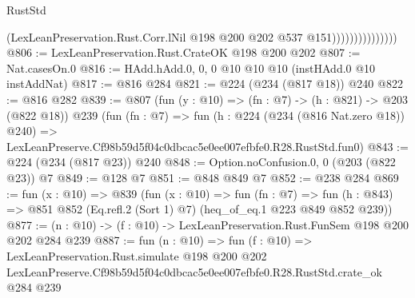 \begin{lexlean}{RustStd}
\begin{coremodule}
                                (LexLeanPreservation.Rust.Corr.lNil
                                  @198
                                  @200
                                  @202
                                  @537
                                  @151)))))))))))))))
@806 := LexLeanPreservation.Rust.CrateOK @198 @200 @202
@807 := Nat.casesOn.{0}
@816 := HAdd.hAdd.{0, 0, 0} @10 @10 @10 (instHAdd.{0} @10 instAddNat)
@817 := @816 @284
@821 := @224 (@234 (@817 @18)) @240
@822 := @816 @282
@839 := @807
    (fun (y : @10) => (fn : @7) -> (h : @821) -> @203 (@822 @18))
    @239
    (fun (fn : @7) =>
    fun (h : @224 (@234 (@816 Nat.zero @18)) @240) =>
    LexLeanPreserve.Cf98b59d5f04c0dbcac5e0ee007efbfe0.R28.RustStd.fun0)
@843 := @224 (@234 (@817 @23)) @240
@848 := Option.noConfusion.{0, 0} (@203 (@822 @23)) @7
@849 := @128 @7
@851 := @848 @849 @7
@852 := @238 @284
@869 := fun (x : @10) =>
  @839
    (fun (x : @10) =>
    fun (fn : @7) =>
    fun (h : @843) => @851 @852 (Eq.refl.{2} (Sort 1) @7) (heq_of_eq.{1} @223 @849 @852 @239))
@877 := (n : @10) -> (f : @10) -> LexLeanPreservation.Rust.FunSem @198 @200 @202 @284 @239
@887 := fun (n : @10) =>
  fun (f : @10) =>
  LexLeanPreservation.Rust.simulate
    @198
    @200
    @202
    LexLeanPreserve.Cf98b59d5f04c0dbcac5e0ee007efbfe0.R28.RustStd.crate_ok
    @284
    @239
\end{coremodule}
\end{lexlean}
